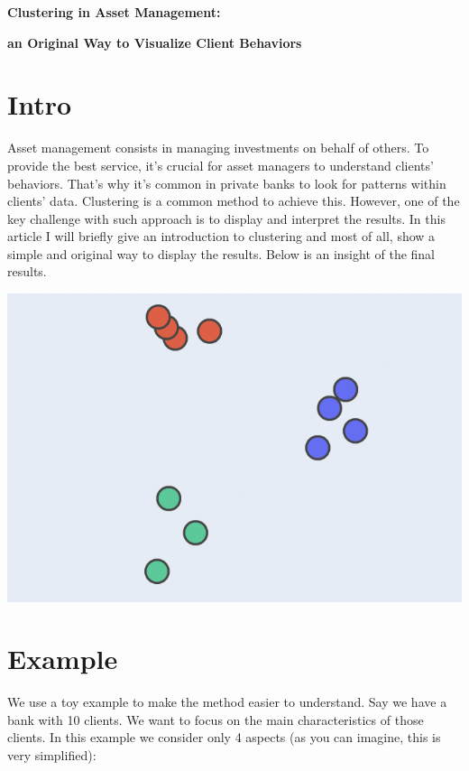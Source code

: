 {\fontsize{25pt}{40pt} \textbf{Clustering in Asset Management:}\par}
{\fontsize{25pt}{40pt} \textbf{an Original Way to Visualize Client Behaviors}\par}

\section{Intro}

Asset management consists in managing investments on behalf of others. To provide the best service, it's crucial for asset managers to understand clients' behaviors. That's why it's common in private banks to look for patterns within clients' data. Clustering is a common method to achieve this. However, one of the key challenge with such approach is to display and interpret the results. In this article I will briefly give an introduction to clustering and most of all, show a simple and original way to display the results. Below is an insight of the final results.

\begin{center}
\includegraphics[scale=0.5]{./../img/clusters-static.png}
\end{center}

\section{Example}

We use a toy example to make the method easier to understand. Say we have a bank with 10 clients. We want to focus on the main characteristics of those clients. In this example we consider only 4 aspects (as you can imagine, this is very simplified): \\

